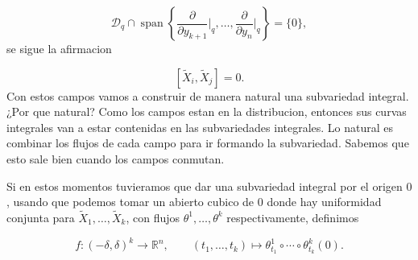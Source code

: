 \begin{bookproof}{}
\[
\mathcal D_q\cap\operatorname{span}\left\{\frac{\partial}{\partial y_{k+1}}\bigg|_q,\ldots,\frac{\partial}{\partial y_n}\bigg|_q\right\}=\{0\},
\]
se sigue la afirmacion

\[
[\widetilde X_i,\widetilde X_j]=0.
\]
Con estos campos vamos a construir de manera natural una subvariedad integral. ¿Por que natural? Como los campos estan en la distribucion, entonces sus curvas integrales van a estar contenidas en las subvariedades integrales. Lo natural es combinar los flujos de cada campo para ir formando la subvariedad. Sabemos que esto sale bien cuando los campos conmutan.

Si en estos momentos tuvieramos que dar una subvariedad integral por el origen $0$, usando que podemos tomar un abierto cubico de $0$ donde hay uniformidad conjunta para $\widetilde X_1,\ldots,\widetilde X_k$, con flujos $\theta^1,\ldots,\theta^k$ respectivamente, definimos

\[
f:(-\delta,\delta)^k\to\mathbb R^n,\qquad (t_1,\ldots,t_k)\mapsto\theta^1_{t_1}\circ\cdots\circ\theta^k_{t_k}(0).
\]
\bookqed
\end{bookproof}

